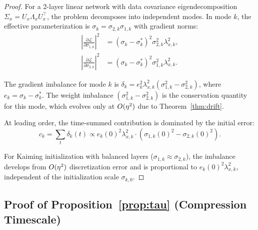 \begin{proof}
For a 2-layer linear network with data covariance eigendecomposition $\Sigma_x = U_x\Lambda_x U_x^\top$, the problem decomposes into independent modes. In mode $k$, the effective parameterization is $\sigma_k = \sigma_{2,k}\sigma_{1,k}$ with gradient norms:
\begin{align}
    \left|\frac{\partial\mathcal{L}}{\partial\sigma_{1,k}}\right|^2 &= (\sigma_k - \sigma_k^*)^2 \sigma_{2,k}^2 \lambda_{x,k}^2, \\
    \left|\frac{\partial\mathcal{L}}{\partial\sigma_{2,k}}\right|^2 &= (\sigma_k - \sigma_k^*)^2 \sigma_{1,k}^2 \lambda_{x,k}^2.
\end{align}

The gradient imbalance for mode $k$ is $\delta_k = e_k^2 \lambda_{x,k}^2 (\sigma_{1,k}^2 - \sigma_{2,k}^2)$, where $e_k = \sigma_k - \sigma_k^*$. The weight imbalance $(\sigma_{1,k}^2 - \sigma_{2,k}^2)$ is the conservation quantity for this mode, which evolves only at $O(\eta^2)$ due to Theorem~\ref{thm:drift}.

At leading order, the time-summed contribution is dominated by the initial error:
\begin{equation}
    c_k = \sum_t \delta_k(t) \propto e_k(0)^2 \lambda_{x,k}^2 \cdot (\sigma_{1,k}(0)^2 - \sigma_{2,k}(0)^2).
\end{equation}

For Kaiming initialization with balanced layers ($\sigma_{1,k} \approx \sigma_{2,k}$), the imbalance develops from $O(\eta^2)$ discretization error and is proportional to $e_k(0)^2\lambda_{x,k}^2$, independent of the initialization scale $\sigma_{k,0}$.
\end{proof}

\subsection{Proof of Proposition~\ref{prop:tau} (Compression Timescale)}
\label{app:proof:tau}

